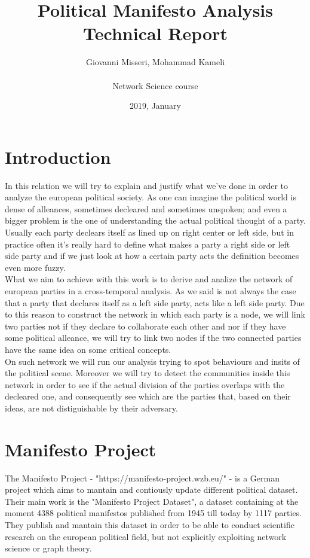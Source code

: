 \documentclass{article}%
\title{%
  Political Manifesto Analysis \\
  \large Technical Report}
\date{2019, January}
\author{Giovanni Misseri, Mohammad Kameli \\ \\ 
Network Science course}
\begin{document}
\maketitle
\section{Introduction}
In this relation we will try to explain and justify what we've done in order to analyze the european political society.
As one can imagine the political world is dense of alleances, sometimes decleared and sometimes unspoken; and even a bigger problem is the one of understanding the actual political thought of a party.
Usually each party declears itself as lined up on right center or left side, but in practice often it's really hard to define what makes a party a right side or left side party and if we just look at how a certain party acts the definition becomes even more fuzzy.\\

What we aim to achieve with this work is to derive and analize the network of european parties in a cross-temporal analysis. As we said is not always the case that a party that declares itself as a left side party, acts like a left side party. Due to this reason to construct the network in which each party is a node, we will link two parties not if they declare to collaborate each other and nor if they have some political alleance, we will try to link two nodes if the two connected parties have the same idea on some critical concepts.\\

On such network we will run our analysis trying to spot behaviours and insits of the political scene. Moreover we will try to detect the communities inside this network in order to see if the actual division of the parties overlaps with the decleared one, and consequently see which are the parties that, based on their ideas, are not distiguishable by their adversary.

\section*{Manifesto Project}

The Manifesto Project - "https://manifesto-project.wzb.eu/" - is a German project which aims to mantain and contiously update different political dataset. Their main work is the "Manifesto Project Dataset", a dataset containing at the moment 4388 political manifestos published from 1945 till today by 1117 parties.
They publish and mantain this dataset in order to be able to conduct scientific research on the european political field, but not explicitly exploiting network science or graph theory.
\end{document}
